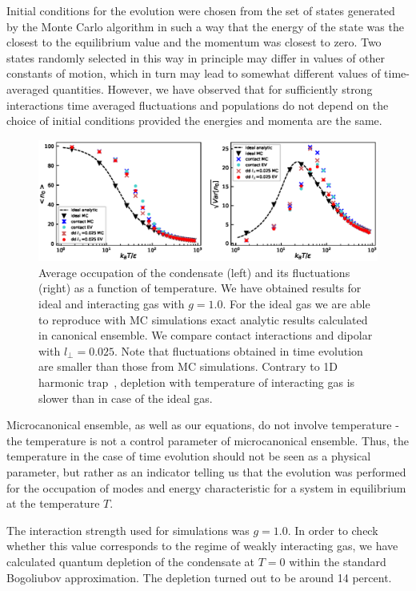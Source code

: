 \documentclass[aps,pra,reprint]{revtex4-2}
\begin{document}
Initial conditions for the evolution were chosen from the set of states 
generated by the Monte Carlo algorithm in such a way  that the energy of the 
state was the closest to the equilibrium value and the momentum was closest to 
zero. Two states randomly selected in this way in principle  may differ in 
values of other constants of motion, which in turn may lead to somewhat 
different values of time-averaged quantities. However, we have observed that 
for sufficiently strong interactions time averaged fluctuations and populations 
do not depend on the choice of initial conditions provided the energies 
and momenta are the same.
\begin{figure}[!]
\includegraphics{fig2.eps}
\caption{Average occupation of the condensate (left) and its fluctuations 
(right) as a function of temperature. We have obtained results for ideal and 
interacting gas with $g=1.0$. For the ideal gas we are able to reproduce with 
MC simulations exact analytic results calculated in canonical ensemble. We 
compare contact interactions and dipolar with $l_{\perp}=0.025$. Note that 
fluctuations obtained in time evolution are smaller than those from MC 
simulations. Contrary to 1D harmonic trap~\cite{Bienias2011b}, depletion with 
temperature of interacting gas is slower than in case of the ideal gas.}
\label{fig:stat}
\end{figure}

Microcanonical ensemble, as well as our equations, do not involve 
temperature - the temperature is not a control parameter of microcanonical 
ensemble. Thus, the temperature in the case of time evolution should not be 
seen as a physical parameter, but rather as an indicator telling us that 
the evolution was performed for the  occupation of modes and energy 
characteristic for a system in equilibrium at the temperature $T$.
    
The interaction strength used for simulations was $g=1.0$. In order to check 
whether this value corresponds to the regime of weakly interacting gas, we have 
calculated quantum depletion of the condensate at $T=0$ within the standard 
Bogoliubov approximation. The depletion turned out to be around 14 percent.
\end{document}

